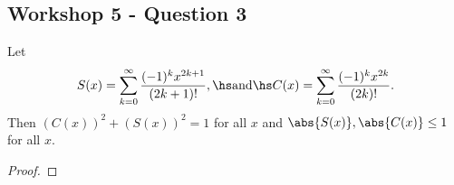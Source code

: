 \documentclass{article}
\begin{document}
\subsection*{Workshop 5 - Question 3}

\begin{claim*}
   Let
   \begin{align*}
      S(x)=\sum_{k=0}^\infty \frac{(-1)^k x^{2k+1}}{(2k+1)!},\hs \text{and}\hs
      C(x) = \sum_{k=0}^\infty \frac{(-1)^k x^{2k}}{(2k)!}.
   \end{align*}
   Then $(C(x))^2 + (S(x))^2 = 1$ for all $x$ and $\abs{S(x)},\abs{C(x)}\leq 1$ 
   for all $x$.
\end{claim*}

\begin{proof}
   
\end{proof}
\end{document}

